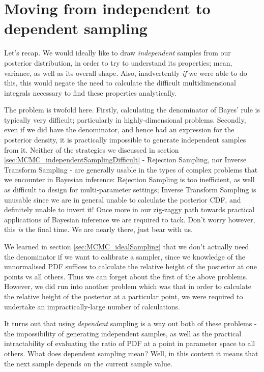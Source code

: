 \documentclass[11pt,fullpage]{book}
\begin{document}
\section{Moving from independent to dependent sampling}\label{sec:MCMC_independentToDependent}
Let's recap. We would ideally like to draw \textit{independent} samples from our posterior distribution, in order to try to understand its properties; mean, variance, as well as its overall shape. Also, inadvertently \textit{if} we were able to do this, this would negate the need to calculate the difficult multidimensional integrals necessary to find these properties analytically.

The problem is twofold here. Firstly, calculating the denominator of Bayes' rule is typically very difficult; particularly in highly-dimensional problems. Secondly, even if we did have the denominator, and hence had an expression for the posterior density, it is practically impossible to generate independent samples from it. Neither of the strategies we discussed in section \ref{sec:MCMC_independentSamplingDifficult} - Rejection Sampling, nor Inverse Transform Sampling - are generally usable in the types of complex problems that we encounter in Bayesian inference: Rejection Sampling is too inefficient, as well as difficult to design for multi-parameter settings; Inverse Transform Sampling is unusable since we are in general unable to calculate the posterior CDF, and definitely unable to invert it! Once more in our zig-zaggy path towards practical applications of Bayesian inference we are required to tack. Don't worry however, this \textit{is} the final time. We are nearly there, just bear with us.

We learned in section \ref{sec:MCMC_idealSampling} that we don't actually need the denominator if we want to calibrate a sampler, since we knowledge of the unnormalised PDF suffices to calculate the relative height of the posterior at one points vs all others. Thus we can forget about the first of the above problems. However, we did run into another problem which was that in order to calculate the relative height of the posterior at a particular point, we were required to undertake an impractically-large number of calculations. 

It turns out that using \textit{dependent} sampling is a way out both of these problems - the impossibility of generating independent samples, as well as the practical intractability of evaluating the ratio of PDF at a point in parameter space to all others. What does dependent sampling mean? Well, in this context it means that the next sample depends on the current sample value.
\end{document}
